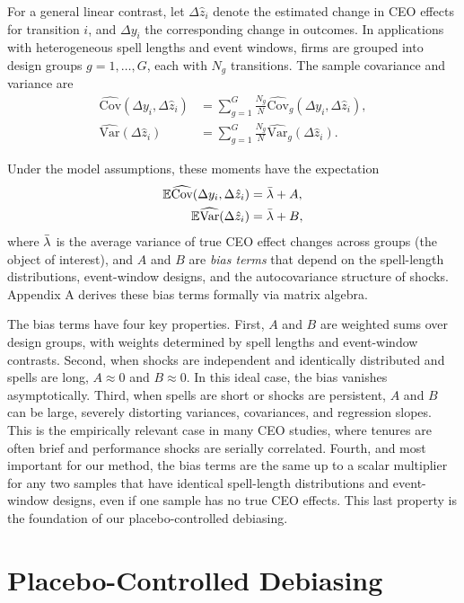 \documentclass[11pt,a4paper]{article}
\newcommand{\Var}{\text{Var}}
\newcommand{\Cov}{\text{Cov}}
\begin{document}
For a general linear contrast, let $\Delta \hat z_i$ denote the estimated change in CEO effects for transition $i$, and $\Delta y_i$ the corresponding change in outcomes. In applications with heterogeneous spell lengths and event windows, firms are grouped into design groups $g=1,\ldots,G$, each with $N_g$ transitions. The sample covariance and variance are
\begin{align}
\widehat{\Cov}(\Delta y_i,\Delta \hat z_i) &= \sum_{g=1}^G \frac{N_g}{N} \widehat{\Cov}_g(\Delta y_i,\Delta \hat z_i),\\
\widehat{\Var}(\Delta \hat z_i) &= \sum_{g=1}^G \frac{N_g}{N} \widehat{\Var}_g(\Delta \hat z_i).
\end{align}

Under the model assumptions, these moments have the expectation
\begin{align}
\mathbb E\widehat{\Cov}(\Delta y_i,\Delta \hat z_i) &= \Bar\lambda + A,\\
\mathbb E\widehat{\Var}(\Delta \hat z_i) &= \Bar\lambda + B,
\end{align}
where $\Bar\lambda$ is the average variance of true CEO effect changes across groups (the object of interest), and $A$ and $B$ are \emph{bias terms} that depend on the spell-length distributions, event-window designs, and the autocovariance structure of shocks. Appendix A derives these bias terms formally via matrix algebra.

The bias terms have four key properties. First, $A$ and $B$ are weighted sums over design groups, with weights determined by spell lengths and event-window contrasts. Second, when shocks are independent and identically distributed and spells are long, $A\approx 0$ and $B\approx 0$. In this ideal case, the bias vanishes asymptotically. Third, when spells are short or shocks are persistent, $A$ and $B$ can be large, severely distorting variances, covariances, and regression slopes. This is the empirically relevant case in many CEO studies, where tenures are often brief and performance shocks are serially correlated. Fourth, and most important for our method, the bias terms are the same up to a scalar multiplier for any two samples that have identical spell-length distributions and event-window designs, even if one sample has no true CEO effects. This last property is the foundation of our placebo-controlled debiasing.

\section{Placebo-Controlled Debiasing} 
\end{document}
